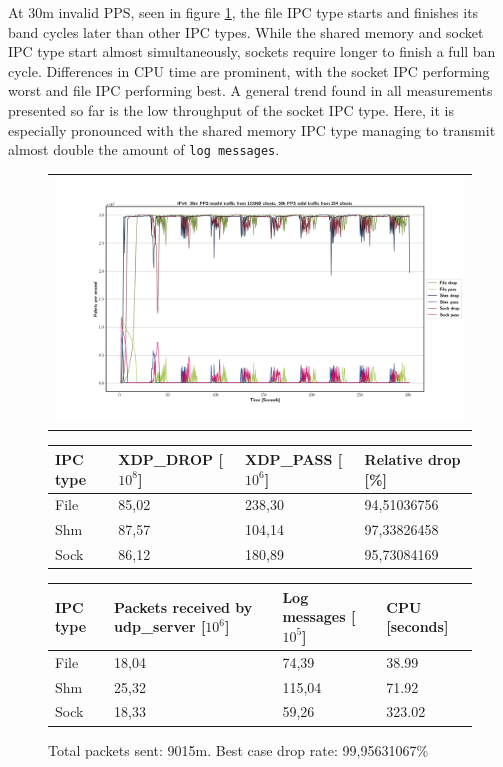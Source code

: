 At 30m invalid PPS, seen in figure \ref{fig:data:ipv4:30m:131068}, the file IPC type starts and finishes its band cycles later than other IPC types.
While the shared memory and socket IPC type start almost simultaneously, sockets require longer to finish a full ban cycle.
Differences in CPU time are prominent, with the socket IPC performing worst and file IPC performing best.
A general trend found in all measurements presented so far is the low throughput of the socket IPC type.
Here, it is especially pronounced with the shared memory IPC type managing to transmit almost double the amount of \texttt{log messages}.

\begin{figure}[!h]
	\centering
	\scriptsize
	\begin{tabular}{c}
    	\centerline{\includegraphics[width=1.2\textwidth]{images/IPv4_30m_131068_2.png}}
	\end{tabular}
	\begin{tabular}{llll}
		\toprule
		\textbf{IPC type} & \textbf{XDP\_DROP [$10^8$]} & \textbf{XDP\_PASS [$10^6$]} & \textbf{Relative drop [\%]} \\ \midrule 
		File & 85,02 & 238,30 & 94,51036756 \\
        Shm & 87,57 & 104,14 & 97,33826458 \\
        Sock & 86,12 & 180,89 & 95,73084169 \\
	\bottomrule
	\end{tabular}
    \begin{tabular}{llll}
		\toprule
		\textbf{IPC type} & \textbf{Packets received by udp\_server [$10^6$]} & \textbf{Log messages [$10^5$]} & \textbf{CPU [seconds]} \\ \midrule 
		File & 18,04 & 74,39 & 38.99 \\
        Shm & 25,32 & 115,04 & 71.92 \\
        Sock & 18,33 & 59,26 & 323.02 \\
	\bottomrule
	\end{tabular}
	\caption[Simplefail2ban, IPv4, 30m \ac{PPS}, 131068 malicious clients]{Total packets sent: 9015m. Best case drop rate: 99,95631067\%}
	\label{fig:data:ipv4:30m:131068}
\end{figure}

